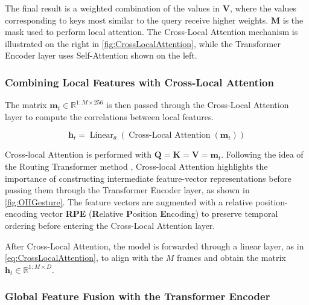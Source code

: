 The final result is a weighted combination of the values in \( \mathbf{V} \), where the values corresponding to keys most similar to the query receive higher weights. $\mathbf{M}$ is the mask used to perform local attention. The Cross-Local Attention mechanism is illustrated on the right in \autoref{fig:CrossLocalAttention}, while the Transformer Encoder layer uses Self-Attention shown on the left.

\subsubsection{Combining Local Features with Cross-Local Attention}


The matrix $\mathbf{m}_{t} \in \mathbb{R}^{1:M \times 256}$ is then passed through the Cross-Local Attention layer to compute the correlations between local features.


\begin{equation}
	\mathbf{h}_{t}  = \operatorname{Linear}_{\theta}  ( \operatorname{Cross-Local\ Attention}( \mathbf{m}_{t}) )
	\label{eq:CrossLocalAttention}
\end{equation}


Cross-local Attention is performed with $\mathbf{Q} = \mathbf{K} = \mathbf{V} = \mathbf{m}_{t}$.
Following the idea of the Routing Transformer method \cite{roy2021efficient}, Cross-local Attention highlights the importance of constructing intermediate feature-vector representations before passing them through the Transformer Encoder layer, as shown in \autoref{fig:OHGesture}.
The feature vectors are augmented with a relative position-encoding vector \textbf{RPE} (\textbf{R}elative \textbf{P}osition \textbf{E}ncoding) to preserve temporal ordering before entering the Cross-Local Attention layer.

After Cross-Local Attention, the model is forwarded through a linear layer, as in \autoref{eq:CrossLocalAttention}, to align with the $M$ frames and obtain the matrix $\mathbf{h}_t \in \mathbb{R}^{1:M \times D}$.

\subsubsection{Global Feature Fusion with the Transformer Encoder}

